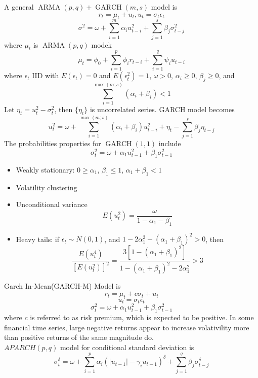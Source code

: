 \documentclass[11pt]{article}
\theoremstyle{definition}
\DeclareMathOperator{\ARMA}{ARMA}
\DeclareMathOperator{\GARCH}{GARCH}
\begin{document}
A general $\ARMA(p,q) + \GARCH(m,s)$ model is
\[
r_t = \mu_t + u_t, u_t = \sigma_t \epsilon_t
\]
\[
\sigma^2 = \omega + \sum_{i=1}^m \alpha_i u_{t-i}^2 +\sum_{j=1}^s \beta_j\sigma_{t-j}^2 
\]
where $\mu_t$ is $\ARMA(p,q)$ modek
\[
\mu_t = \phi_0 + \sum_{i=1}^p \phi_i r_{t-i} + \sum_{i=1}^q \psi_i u_{t-i}
\]
where $\epsilon_t$ IID with $E(\epsilon_t) = 0$ and $E(\epsilon_t^2) = 1$, $\omega > 0$, $\alpha_i\geq 0$, $\beta_j\geq 0$, and
\[
\sum_{i=1}^{\max(m;s)} (\alpha_i + \beta_i) < 1
\]
Let $\eta_t = u_t^2 -\sigma_t^2$, then $\{\eta_t\}$ is uncorrelated series. GARCH model becomes
\[
u_t^2 = \omega + \sum_{i=1}^{\max(m;s)}(\alpha_i + \beta_i)u_{t-i}^2 + \eta_t -\sum_{j=1}^s \beta_j\eta_{t-j}
\]
The probabilities properties for $\GARCH(1,1)$ include
\[
\sigma^2_t =\omega + \alpha_1 u_{t-1}^2 + \beta_1 \sigma_{t-1}^2
\]
\begin{itemize}
\item Weakly stationary: $0\geq \alpha_1$, $\beta_1\leq 1$, $\alpha_1 + \beta_1 <1$
\item Volatility clustering
\item Unconditional variance 
\[
E(u_t^2) = \frac{\omega}{1-\alpha_1-\beta_1}
\]
\item Heavy tails: if $\epsilon_t \sim N(0,1)$, and $1-2\alpha_1^2 -(\alpha_1+\beta_1)^2 > 0$, then
\[
\frac{E(u_t^4)}{[E(u_t^2)]^2} = \frac{3[1-(\alpha_1 + \beta_1)^2]}{1-(\alpha_1 + \beta_1)^2 -2\alpha_1^2} > 3
\]
\end{itemize}
Garch In-Mean(GARCH-M) Model is
\[
r_t = \mu_t + c\sigma_t + u_t
\]
\[
u_t = \sigma_t \epsilon_t
\]
\[
\sigma_t^2 = \omega + \alpha_1u_{t-1}^2 + \beta_1 \sigma_{t-1}^2
\]
where $c$ is referred to as risk premium, which is expected to be positive.
In some financial time series, large negative returns appear to increase volativility more than positive returns of the same magnitude do.\\
$APARCH(p,q)$ model for conditional standard deviation is
\[
\sigma_t^\delta = \omega + \sum_{i=1}^p \alpha_i(|u_{t-1}| - \gamma_i u_{t-1})^\delta + \sum_{j=1}^q \beta_j\sigma_{t-j}^\delta
\]
\end{document}

